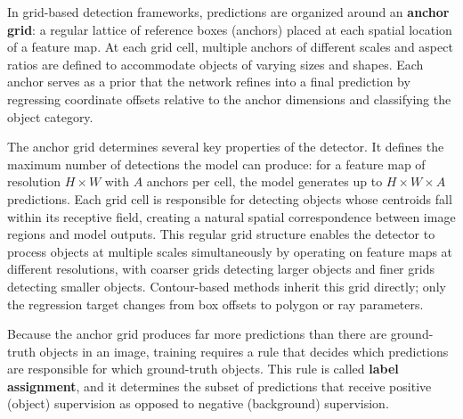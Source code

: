 \label{sec:anchor-grid}

In grid-based detection frameworks, predictions are organized around an \textbf{anchor grid}: a regular lattice of reference boxes (anchors) placed at each spatial location of a feature map. At each grid cell, multiple anchors of different scales and aspect ratios are defined to accommodate objects of varying sizes and shapes. Each anchor serves as a prior that the network refines into a final prediction by regressing coordinate offsets relative to the anchor dimensions and classifying the object category.

The anchor grid determines several key properties of the detector. It defines the maximum number of detections the model can produce: for a feature map of resolution $H \times W$ with $A$ anchors per cell, the model generates up to $H \times W \times A$ predictions. Each grid cell is responsible for detecting objects whose centroids fall within its receptive field, creating a natural spatial correspondence between image regions and model outputs. This regular grid structure enables the detector to process objects at multiple scales simultaneously by operating on feature maps at different resolutions, with coarser grids detecting larger objects and finer grids detecting smaller objects. Contour-based methods inherit this grid directly; only the regression target changes from box offsets to polygon or ray parameters.

\label{sec:label-assignment}

Because the anchor grid produces far more predictions than there are ground-truth objects in an image, training requires a rule that decides which predictions are responsible for which ground-truth objects. This rule is called \textbf{label assignment}, and it determines the subset of predictions that receive positive (object) supervision as opposed to negative (background) supervision.

